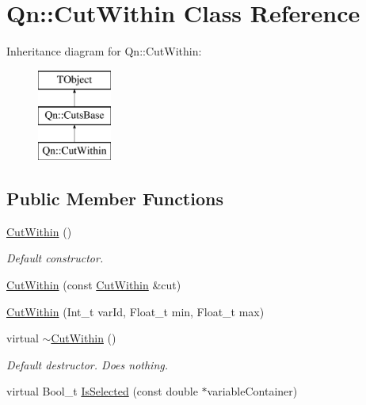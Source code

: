\hypertarget{classQn_1_1CutWithin}{}\section{Qn\+:\+:Cut\+Within Class Reference}
\label{classQn_1_1CutWithin}
Inheritance diagram for Qn\+:\+:Cut\+Within\+:\begin{figure}[H]
\begin{center}
\leavevmode
\includegraphics[height=3.000000cm]{classQn_1_1CutWithin}
\end{center}
\end{figure}
\subsection*{Public Member Functions}
\begin{DoxyCompactItemize}
\item 
\mbox{\label{classQn_1_1CutWithin_aff81a10abb3c7f00c2c4b5868e8a1da5}} 
\mbox{\hyperlink{classQn_1_1CutWithin_aff81a10abb3c7f00c2c4b5868e8a1da5}{Cut\+Within}} ()
\begin{DoxyCompactList}\small\item\em Default constructor. \end{DoxyCompactList}\item 
\mbox{\hyperlink{classQn_1_1CutWithin_a49442a5fdc7b6bfce9818c2c99b859ce}{Cut\+Within}} (const \mbox{\hyperlink{classQn_1_1CutWithin}{Cut\+Within}} \&cut)
\item 
\mbox{\hyperlink{classQn_1_1CutWithin_a8f151a39deb135d441907394c9a9ad17}{Cut\+Within}} (Int\+\_\+t var\+Id, Float\+\_\+t min, Float\+\_\+t max)
\item 
\mbox{\label{classQn_1_1CutWithin_a5f1264641e321d065b4dc4f68aec8ff8}} 
virtual \mbox{\hyperlink{classQn_1_1CutWithin_a5f1264641e321d065b4dc4f68aec8ff8}{$\sim$\+Cut\+Within}} ()
\begin{DoxyCompactList}\small\item\em Default destructor. Does nothing. \end{DoxyCompactList}\item 
virtual Bool\+\_\+t \mbox{\hyperlink{classQn_1_1CutWithin_a0766a4ec99389a9991ee8f2c974bdaf4}{Is\+Selected}} (const double $\ast$variable\+Container)
\end{DoxyCompactItemize}
